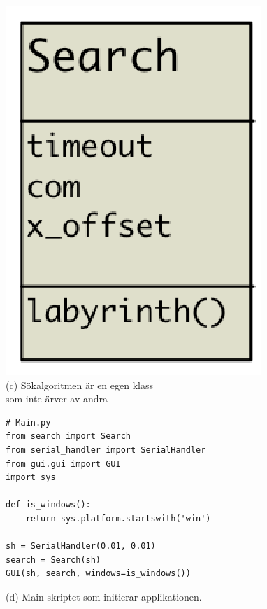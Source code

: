 \begin{minipage}[l]{0.49\textwidth}
    \vspace*{2em}
    \centering
        \includegraphics[scale=0.25]{res/img/search_uml} \\
        \vspace*{3.7em}
        (c) Sökalgoritmen är en egen klass \\ som inte ärver av andra
\end{minipage}
\begin{minipage}[l]{0.49\textwidth}
    \vspace{-3.5em}
        \begin{verbatim}
# Main.py
from search import Search
from serial_handler import SerialHandler
from gui.gui import GUI
import sys

def is_windows():
    return sys.platform.startswith('win')

sh = SerialHandler(0.01, 0.01)
search = Search(sh)
GUI(sh, search, windows=is_windows())
\end{verbatim}
        \centering
        (d) Main skriptet som initierar applikationen.
\end{minipage}
